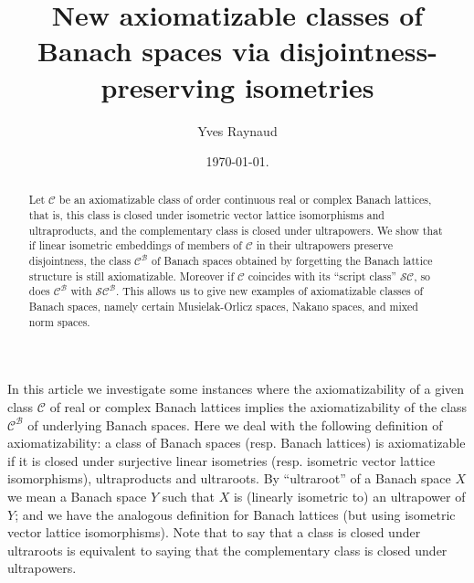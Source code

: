 \documentclass[11pt]{amsart}
\theoremstyle{plain}
\theoremstyle{remark}
\newcommand{\C}{\mathcal C}
\begin{document}
\title[New axiomatizable classes of Banach spaces]{ New axiomatizable classes of Banach spaces via disjointness-preserving isometries}
\author[Y. Raynaud]{Yves Raynaud}
\address{\noindent  Institut de Math\'ematiques de Jussieu-Paris Rive Gauche, CNRS, UPMC (Univ.Paris 06), and Univ. Paris-Diderot, 4 place Jussieu, F-75252 Paris Cedex 05, France}

\begin{abstract} Let $\C$ be an axiomatizable class of order continuous real or complex Banach lattices, that is, this class is closed under isometric vector lattice isomorphisms and ultraproducts, and the complementary class is closed under ultrapowers. We show that if linear isometric embeddings of members of $\C$ in their ultrapowers preserve disjointness, the class $\C^\mathcal B$ of Banach spaces obtained by forgetting the Banach lattice structure is still axiomatizable. Moreover if $\C$ coincides with its ``script class'' $\mathcal{SC}$, so does $\C^\mathcal B$ with $\mathcal{SC}^\mathcal B$. This allows us to give new examples of axiomatizable classes of Banach spaces, namely certain Musielak-Orlicz spaces, Nakano spaces, and mixed norm spaces. 
\end{abstract}

\date{\today.}
\bigskip
\maketitle
  
In this article we investigate some instances where  the axiomatizability of a given class $\C$ of real or complex Banach lattices implies the axiomatizability of the class $\C^\mathcal B$ of underlying Banach spaces. Here we deal with the following definition of   axiomatizability: a class of Banach spaces (resp. Banach lattices) is axiomatizable if it is closed  under surjective linear isometries (resp. isometric vector lattice isomorphisms), ultraproducts and  ultraroots. By ``ultraroot'' of a Banach space $X$ we mean a  Banach space  $Y$ such that $X$ is (linearly isometric to) an ultrapower of $Y$; and we have the analogous definition for Banach lattices (but using isometric vector lattice isomorphisms).  Note that to say that a class is closed under ultraroots is equivalent to saying that the complementary class is closed under ultrapowers. 
\end{document}
